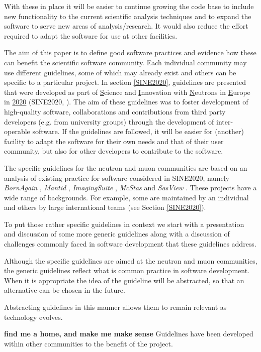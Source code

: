 \documentclass[jnr]{iosart2x}
\newcommand{\todo}[1]{\textbf{#1}}
\begin{document}
With these in place it will be easier to continue growing the code base to include new functionality to the current scientific analysis techniques and to expand the software to serve new areas of analysis/research.
It would also reduce the effort required to adapt the software for use at other facilities.

The aim of this paper is to define good software practices and evidence how these can benefit the scientific software community.
Each individual community may use different guidelines, some of which may already exist and others can be specific to a particular project.
In section \ref{SINE2020}, guidelines are presented that were developed as part of \underline{S}cience and \underline{I}nnovation with \underline{N}eutrons in \underline{E}urope in \underline{2020} (SINE2020, \cite{sine2020}).
The aim of these guidelines was to foster development of high-quality software, collaborations and contributions from third party developers (e.g. from university groups) through the development of inter-operable software.
If the guidelines are followed, it will be easier for (another) facility to adapt the software for their own needs and that of their user community, but also for other developers to contribute to the software.

The specific guidelines for the neutron and muon communities are based on an analysis of existing practice for software considered in SINE2020, namely {\it BornAgain} \cite{bornagain}, {\it Mantid} \cite{mantid}, {\it ImagingSuite} \cite{ImagingSuite}, {\it McStas} \cite{mcstas} and {\it SasView} \cite{sasview}.
These projects have a wide range of backgrounds.
For example, some are maintained by an individual and others by large international teams (see Section \ref{SINE2020}).

To put those rather specific guidelines in context we start with a presentation and discussion of some more generic guidelines along with a discussion of challenges commonly faced in software development that these guidelines address.

Although the specific guidelines are aimed at the neutron and muon communities, the generic guidelines reflect what is common practice in software development.
When it is appropriate the idea of the guideline will be abstracted, so that an alternative can be chosen in the future.

Abstracting guidelines in this manner allows them to remain relevant as technology evolves.

\todo{find me a home, and make me make sense}
Guidelines have been developed within other communities to the benefit of the project.
\end{document}
